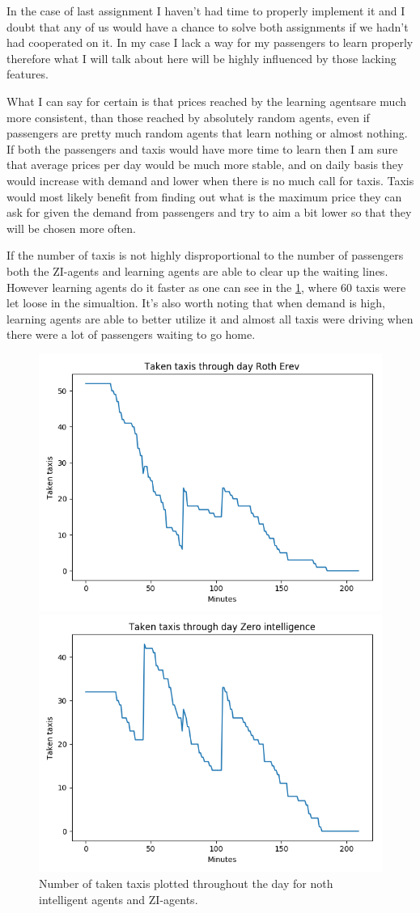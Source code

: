 \documentclass[conference]{IEEEtran}
\begin{document}
In the case of last assignment I haven't had time to properly implement it and I doubt that any of us would have a chance to solve both assignments if we hadn't had cooperated on it. In my case I lack a way for my passengers to learn properly therefore what I will talk about here will be highly influenced by those lacking features. 

What I can say for certain is that prices reached by the learning agentsare much more consistent, than those reached by absolutely random agents, even if passengers are pretty much random agents that learn nothing or almost nothing. If both the passengers and taxis would have more time to learn then I am sure that average prices per day would be much more stable, and on daily basis they would increase with demand and lower when there is no much call for taxis. Taxis would most likely benefit from finding out what is the maximum price they can ask for given the demand from passengers and try to aim a bit lower so that they will be chosen more often.

If the number of taxis is not highly disproportional to the number of passengers both the ZI-agents and learning agents are able to clear up the waiting lines. However learning agents do it faster as one can see in the \cref{fig:TakenTaxis}, where $60$ taxis were let loose in the simualtion. It's also worth noting that when demand is high, learning agents are able to better utilize it and almost all taxis were driving when there were a lot of passengers waiting to go home.

\begin{figure}[htbp]
  \centerline{\includegraphics[width=.4\textwidth]{Taken_Taxis_Roth_Erev}}
  \centerline{\includegraphics[width=.4\textwidth]{Taken_Taxis_Zero_Int}}
  \caption{Number of taken taxis plotted throughout the day for noth intelligent agents and ZI-agents.}
  \label{fig:TakenTaxis}
\end{figure}
\end{document}
